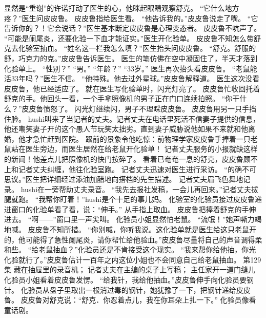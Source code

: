 \documentclass[a4paper,12pt,UTF8,twoside]{ctexbook}
\begin{document}
        显然是“重谢”的许诺打动了医生的心，他眯起眼睛观察舒克。 
        “它什么地方疼？”医生问皮皮鲁。 
        皮皮鲁指给医生看。 
        “他告诉我的。”皮皮鲁说走了嘴。 
        “它告诉你的？！它会说话？”医生基本断定皮皮鲁是心理变态者。 
        皮皮鲁不吭声了。 
        “可能是阑尾炎，还要化验一下血才能证实。”医生开化验单。 
        皮皮鲁不知怎么带舒克去化验室抽血。 
        “姓名这一栏我怎么填？”医生抬头问皮皮鲁。 
        “舒克。舒服的舒，巧克力的克。”皮皮鲁告诉医生。 
        医生的笔仿佛在空中凝固住了，半天才落到化验单上。 
        “性别？” 
        “男。” 
        “年龄？” 
        “33岁。” 
        医生再次抬头看皮皮鲁。 
        “老鼠能活33年吗？”医生不信。 
        “他特殊。他去过外星球。”皮皮鲁解释道。 
        医生这次没看皮皮鲁，他已经适应了。 
        就在医生写化验单时，闪光灯亮了。 
        皮皮鲁忙收回托着舒克的手。他回头一看，一个手拿照像机的男子正在门口连续拍照。 
        “你干什么？”皮皮鲁愤怒了。 
        闪光灯继续闪，男子不理睬皮皮鲁。 
        皮皮鲁用另一只手挡住脸。 
        hushi叫来了当记者的丈夫。记者丈夫在电话里死活不信妻子提供的信息，他还嘲笑妻子开的这个愚人节玩笑太拙劣。直到妻子威胁说他如果不来就和他离婚，他才急忙赶到医院。 
        跟前的景象令他吃惊：前物理学家皮皮鲁手捧着一只老鼠站在医生旁边，而医生居然在给老鼠开化验单！ 
        记者丈夫服务的小报就缺这样的新闻！他差点儿把照像机的快门按碎了。 
        看着已奄奄一息的舒克，皮皮鲁顾不上和记者丈夫纠缠，他往化验室跑。 
        记者丈夫迅速对医生进行采访。 
        “的确不可思议。”医生把详细经过添油加醋地向搭档的先生描述。 
        记者丈夫眉飞色舞地记录。 
        hushi在一旁帮助丈夫录音。 
        “我先去报社发稿，一会儿再回来。”记者丈夫拔腿就跑。 
        “我帮你盯着！”hushi是个十足的事儿妈。 
        化验室的化验员接过皮皮鲁递进窗口的化验单看了看，说：“伸手。” 
        从手指上取血。 
        皮皮鲁把捧着舒克的手伸进去。 
        “啊——”窗口里一声尖叫。 
        化验员小姐显然怕老鼠。 
        “流氓！”她声嘶力竭地喊。 
        皮皮鲁不知所措。 
        “你别喊，你听我说。这化验单就是医生给这只老鼠开的，他可能得了急性阑尾炎，请你帮忙给他验血。”皮皮鲁尽量将自己的声音调得柔和些。 
        “给老鼠抽血？”化验员还是不肯接受这个现实。 
        “我来帮你给他抽，你光化验就行了。”皮皮鲁估计一百年之内这位小姐也不会同意自己给老鼠抽血。   第129集 
        藏在抽屉里的录音机； 
        记者丈夫在主编的桌子上写稿； 
        主任家开一道门缝儿   
        化验员小姐看着皮皮鲁发愣。 
        “给我针，我给他抽血。”皮皮鲁伸手向化验员要钢针。 
        化验员从盘子里取出一根消过毒的钢针，她犹豫了一下，把钢针递给皮皮鲁。 
        皮皮鲁对舒克说：“舒克．你忍着点儿，我在你耳朵上扎一下。” 
        化验员像看童话剧。 
\end{document}
